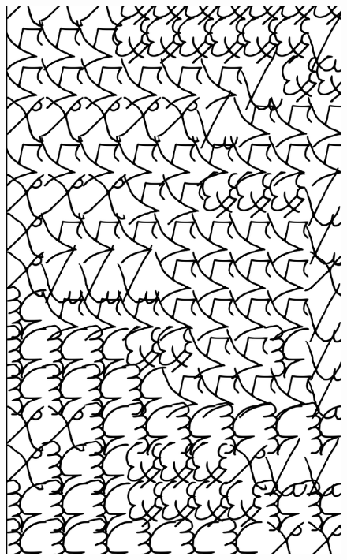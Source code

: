 \makeatletter\@openrightfalse
\movetooddpage
\begin{absolutelynopagebreak}
\begin{vplace}
\begin{figure}[H]
\begin{adjustwidth}{-0.99cm}{}
  \centering
  \vspace*{-1.97cm}
  \hspace*{-0.65cm}
  \includegraphics[width=115mm]{./imgs/img14.pdf}  
  \hfill
\end{adjustwidth}

\thispagestyle{empty}

\end{figure}
\end{vplace}

\end{absolutelynopagebreak}
